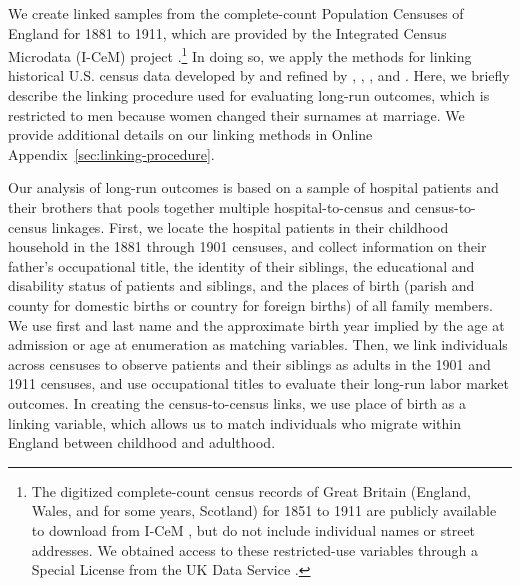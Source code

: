 \documentclass[12pt,english]{article}
\begin{document}
We create linked samples from the complete-count Population Censuses of England for 1881 to 1911, which are provided by the Integrated Census Microdata (I-CeM) project \citep{SchurerHiggs2020,SchurerHiggs2022}.\footnote{The digitized complete-count census records of Great Britain (England, Wales, and for some years, Scotland) for 1851 to 1911 are publicly available to download from I-CeM \citep{SchurerHiggs2020}, but do not include individual names or street addresses. We obtained access to these restricted-use variables through a Special License from the UK Data Service \citep{SchurerHiggs2022}.} In doing so, we apply the methods for linking historical U.S. census data developed by \cite{Ferrie1996} and refined by \cite{ABE2012}, \cite{Feigenbaum2016}, \cite{MillStein2016}, and \cite{BaileyColeHendersonMassey2020}. Here, we briefly describe the linking procedure used for evaluating long-run outcomes, which is restricted to men because women changed their surnames at marriage.  We provide additional details on our linking methods in Online Appendix~\ref{sec:linking-procedure}.

Our analysis of long-run outcomes is based on a sample of hospital patients and their brothers that pools together multiple hospital-to-census and census-to-census linkages. First, we locate the hospital patients in their childhood household in the 1881 through 1901 censuses, and collect information on their father's occupational title, the identity of their siblings, the educational and disability status of patients and siblings, and the places of birth (parish and county for domestic births or country for foreign births) of all family members. We use first and last name and the approximate birth year implied by the age at admission or age at enumeration as matching variables. Then, we link individuals across censuses to observe patients and their siblings as adults in the 1901 and 1911 censuses, and use occupational titles to evaluate their long-run labor market outcomes. In creating the census-to-census links, we use place of birth as a linking variable, which allows us to match individuals who migrate within England between childhood and adulthood.
\end{document}
